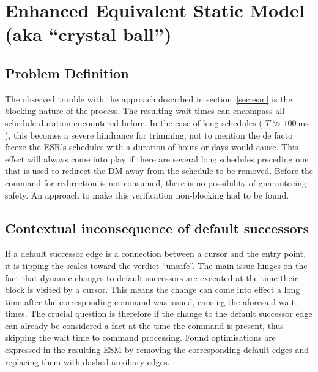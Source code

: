 \section{Enhanced Equivalent Static Model\\(aka \enquote{crystal ball})}
\label{sec:eesm}
\subsection{Problem Definition}
The observed trouble with the approach described in section~\ref{sec:esm} is the blocking nature of the process. The resulting wait times can encompass all schedule duration encountered before. In the case of long schedules ( $T \gg \SI{100}{\milli\second}$ ), this becomes a severe hindrance for trimming, not to mention the de facto freeze the ESR's schedules with a duration of hours or days would cause.
This effect will always come into play if there are several long schedules preceding one that is used to redirect the DM away from the schedule to be removed. Before the command for redirection is not consumed, there is no possibility of guaranteeing safety. An approach to make this verification non-blocking had to be found.

\subsection{Contextual inconsequence of default successors}
If a default successor edge is a connection between a cursor and the entry point, it is tipping the scales toward the verdict \enquote{unsafe}.
The main issue hinges on the fact that dynamic changes to default successors are executed at the time their block is visited by a cursor. This means the change can come into effect a long time after the corresponding command was issued, causing the aforesaid wait times. The crucial question is therefore if the change to the default successor edge can already be considered a fact at the time the command is present, thus skipping the wait time to command processing. Found optimisations are expressed in the resulting ESM by removing the corresponding default edges and replacing them with dashed auxiliary edges.

